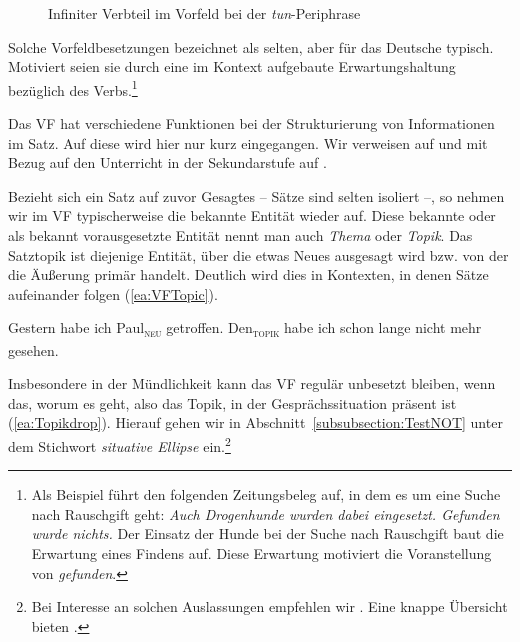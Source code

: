 \begin{figure}[!htbp]
  \centering
  \caption{Infiniter Verbteil im Vorfeld bei der \textit{tun}-Periphrase}
  \label{fig:FeldermodelV2mitINFTUNimVF}
\end{figure}

Solche Vorfeldbesetzungen bezeichnet \citet[202]{Zifonun2021DtEur} als selten, aber für das Deutsche typisch. Motiviert seien sie durch eine im Kontext aufgebaute Erwartungshaltung bezüglich des Verbs.\footnote{Als Beispiel führt \citet[202]{Zifonun2021DtEur} den folgenden Zeitungsbeleg auf, in dem es um eine Suche nach Rauschgift geht: \textit{Auch Drogenhunde wurden dabei eingesetzt. Gefunden wurde nichts.} Der Einsatz der Hunde bei der Suche nach Rauschgift baut die Erwartung eines Findens auf. Diese Erwartung motiviert die Voranstellung von \textit{gefunden}.}   

Das VF hat verschiedene Funktionen bei der Strukturierung von Informationen im Satz. Auf diese wird hier nur kurz eingegangen. Wir verweisen auf \citet{Musan2017} und mit Bezug auf den Unterricht in der Sekundarstufe auf \citet{Averintseva-KlischPeschel2014}. 

Bezieht sich ein Satz auf zuvor Gesagtes -- Sätze sind selten isoliert --, so nehmen wir im VF typischerweise die bekannte Entität wieder auf. Diese bekannte oder als bekannt vorausgesetzte Entität nennt man auch \textit{Thema} oder \textit{Topik}. Das Satztopik ist diejenige Entität, über die etwas Neues ausgesagt wird bzw. von der die Äußerung primär handelt. Deutlich wird dies in Kontexten, in denen Sätze aufeinander folgen (\ref{ea:VFTopic}). 

\ea \label{ea:VFTopic} Gestern habe ich Paul\textsubscript{\textsc{neu}} getroffen. Den\textsubscript{\textsc{topik}} habe ich schon lange nicht mehr gesehen. 
\z 

Insbesondere in der Mündlichkeit kann das VF regulär unbesetzt bleiben, wenn das, worum es geht, also das Topik, in der Gesprächssituation präsent ist (\ref{ea:Topikdrop}). Hierauf gehen wir in Abschnitt~\ref{subsubsection:TestNOT} unter dem Stichwort \textit{situative Ellipse} ein.\footnote{Bei Interesse an solchen Auslassungen empfehlen wir \citet{Fries1988}. Eine knappe Übersicht bieten \citet[413--418]{ZifHoffStr1997}.}

